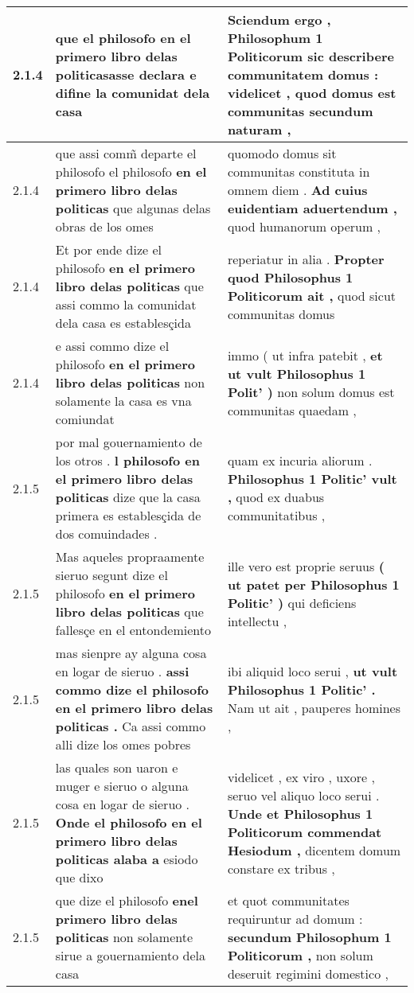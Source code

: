 \begin{tabular}{|p{1cm}|p{6.5cm}|p{6.5cm}|}
2.1.4 & que el philosofo en el primero libro delas \textbf{ politicasasse declara } e difine la comunidat dela casa & Sciendum ergo , \textbf{ Philosophum 1 Politicorum sic describere communitatem domus : } videlicet , quod domus est communitas secundum naturam , \\\hline
2.1.4 & que assi comm̃ departe el philosofo el philosofo \textbf{ en el primero libro delas politicas } que algunas delas obras de los omes & quomodo domus sit communitas constituta in omnem diem . \textbf{ Ad cuius euidentiam aduertendum , } quod humanorum operum , \\\hline
2.1.4 & Et por ende dize el philosofo \textbf{ en el primero libro delas politicas } que assi commo la comunidat dela casa es establesçida & reperiatur in alia . \textbf{ Propter quod Philosophus 1 Politicorum ait , } quod sicut communitas domus \\\hline
2.1.4 & e assi commo dize el philosofo \textbf{ en el primero libro delas politicas } non solamente la casa es vna comiundat & immo ( ut infra patebit , \textbf{ et ut vult Philosophus 1 Polit’ ) } non solum domus est communitas quaedam , \\\hline
2.1.5 & por mal gouernamiento de los otros . \textbf{ l philosofo en el primero libro delas politicas } dize que la casa primera es establesçida de dos comuindades . & quam ex incuria aliorum . \textbf{ Philosophus 1 Politic’ vult , } quod ex duabus communitatibus , \\\hline
2.1.5 & Mas aqueles propraamente sieruo segunt dize el philosofo \textbf{ en el primero libro delas politicas } que fallesçe en el entondemiento & ille vero est proprie seruus \textbf{ ( ut patet per Philosophus 1 Politic’ ) } qui deficiens intellectu , \\\hline
2.1.5 & mas sienpre ay alguna cosa en logar de sieruo . \textbf{ assi commo dize el philosofo en el primero libro delas politicas . } Ca assi commo alli dize los omes pobres & ibi aliquid loco serui , \textbf{ ut vult Philosophus 1 Politic’ . } Nam ut ait , pauperes homines , \\\hline
2.1.5 & las quales son uaron e muger e sieruo o alguna cosa en logar de sieruo . \textbf{ Onde el philosofo en el primero libro delas politicas alaba a } esiodo que dixo & videlicet , ex viro , uxore , seruo vel aliquo loco serui . \textbf{ Unde et Philosophus 1 Politicorum commendat Hesiodum , } dicentem domum constare ex tribus , \\\hline
2.1.5 & que dize el philosofo \textbf{ enel primero libro delas politicas } non solamente sirue a gouernamiento dela casa & et quot communitates requiruntur ad domum : \textbf{ secundum Philosophum 1 Politicorum , } non solum deseruit regimini domestico , \\\hline

\end{tabular}
